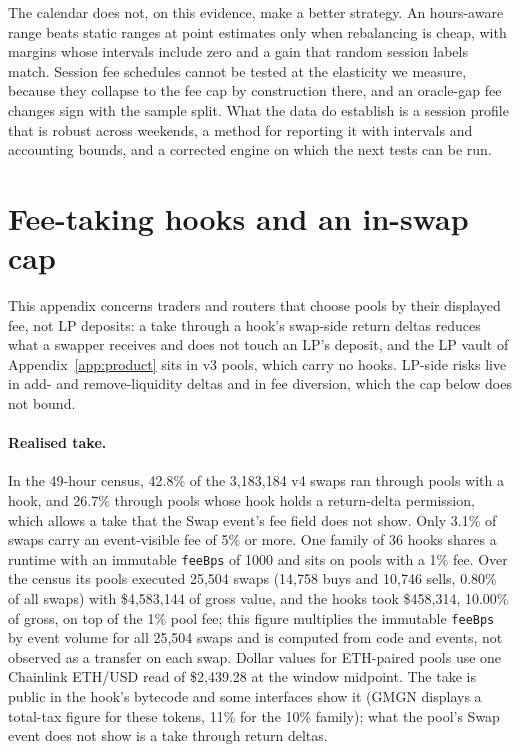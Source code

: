 \documentclass[11pt]{article}
\newcommand{\USD}{\$}
\begin{document}
The calendar does not, on this evidence, make a better strategy. An hours-aware range beats static ranges at point estimates only when rebalancing is cheap, with margins whose intervals include zero and a gain that random session labels match. Session fee schedules cannot be tested at the elasticity we measure, because they collapse to the fee cap by construction there, and an oracle-gap fee changes sign with the sample split. What the data do establish is a session profile that is robust across weekends, a method for reporting it with intervals and accounting bounds, and a corrected engine on which the next tests can be run.

\FloatBarrier



\clearpage
\appendix
\section{Fee-taking hooks and an in-swap cap}\label{app:hooks}

This appendix concerns traders and routers that choose pools by their displayed fee, not LP deposits: a take through a hook's swap-side return deltas reduces what a swapper receives and does not touch an LP's deposit, and the LP vault of Appendix~\ref{app:product} sits in v3 pools, which carry no hooks. LP-side risks live in add- and remove-liquidity deltas and in fee diversion, which the cap below does not bound.

\paragraph{Realised take.} In the 49-hour census, 42.8\% of the 3,183,184 v4 swaps ran through pools with a hook, and 26.7\% through pools whose hook holds a return-delta permission, which allows a take that the Swap event's fee field does not show. Only 3.1\% of swaps carry an event-visible fee of 5\% or more. One family of 36 hooks shares a runtime with an immutable \texttt{feeBps} of 1000 and sits on pools with a 1\% fee. Over the census its pools executed 25,504 swaps (14,758 buys and 10,746 sells, 0.80\% of all swaps) with \USD4,583,144 of gross value, and the hooks took \USD458,314, 10.00\% of gross, on top of the 1\% pool fee; this figure multiplies the immutable \texttt{feeBps} by event volume for all 25,504 swaps and is computed from code and events, not observed as a transfer on each swap. Dollar values for ETH-paired pools use one Chainlink ETH/USD read of \USD2,439.28 at the window midpoint. The take is public in the hook's bytecode and some interfaces show it (GMGN displays a total-tax figure for these tokens, 11\% for the 10\% family); what the pool's Swap event does not show is a take through return deltas.
\end{document}
